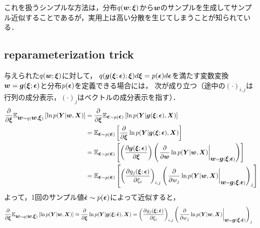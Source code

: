 これを扱うシンプルな方法は，分布$q(\vw;\vxi)$から$\vw$のサンプルを生成してサンプル近似することであるが，実用上は高い分散を生じてしまうことが知られている．


\subsection{reparameterization trick \cite{diederik2014auto}}
与えられた$q(\vw;\vxi)$に対して，
$q(\vg(\vxi;\vepsilon);\vxi)d\vxi=p(\vepsilon)d\vepsilon$を満たす変数変換$\vw=\vg(\vxi;\vepsilon)$と分布$p(\vepsilon)$を定義できる場合には，
次が成り立つ（途中の$(\cdot)_{i,j}$は行列の成分表示，$(\cdot)_{j}$はベクトルの成分表示を指す）．
\begin{align*}
\frac{\partial}{\partial \vxi}
\mathbb{E}_{\vw\sim q(\vw;\vxi)}
\left[
\ln p(\vY|\vw,\vX)
\right]
&=
\frac{\partial}{\partial \vxi}
\mathbb{E}_{\vepsilon\sim p(\vepsilon)}
\left[
\ln p(\vY|\vg(\vxi;\vepsilon),\vX)
\right]
\\
&=
\mathbb{E}_{\vepsilon\sim p(\vepsilon)}
\left[
\frac{\partial}{\partial \vxi}
\ln p(\vY|\vg(\vxi;\vepsilon),\vX)
\right]
\\
&=
\mathbb{E}_{\vepsilon\sim p(\vepsilon)}
\left[
\left(
\frac{\partial \vg(\vxi;\vepsilon)}{\partial \vxi}
 \right)
\left(
\left.
\frac{\partial}{\partial \vw}
\ln p(\vY|\vw,\vX)
\right|_{\vw=\vg(\vxi;\vepsilon)}
\right)
\right]
\\
&=
\mathbb{E}_{\vepsilon\sim p(\vepsilon)}
\left[
\left(
\frac{\partial g_j(\vxi;\vepsilon)}{\partial \xi_i}
\right)_{i,j}
\left(
\left. \frac{\partial}{\partial w_j} \ln p(\vY|\vw,\vX) \right|_{\vw=\vg(\vxi;\vepsilon)}
\right)_{j}
\right]
\end{align*}
よって，1回のサンプル値$\tilde{\vepsilon}\sim p(\vepsilon)$によって近似すると，
\begin{align*}
\frac{\partial}{\partial \vxi}
\mathbb{E}_{\vw\sim q(\vw;\vxi)}
\left[
\ln p(\vY|\vw,\vX)
\right]
&\approx
\frac{\partial}{\partial \vxi}
\ln p(\vY|\vg(\vxi;\tilde{\vepsilon}),\vX)
=
\left(
\frac{\partial g_j(\vxi;\tilde{\vepsilon})}{\partial \xi_i}
\right)_{i,j}
\left(
\left. \frac{\partial}{\partial w_j} \ln p(\vY|\vw,\vX) \right|_{\vw=\vg(\vxi;\tilde{\vepsilon})}
\right)_{j}
\end{align*}



